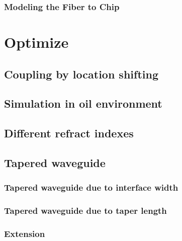 \subsection{Modeling the Fiber to Chip}
\label{sect:model_model_fiber2chip}


%
\chapter{Optimize}
\label{chp:optim}


\section{Coupling by location shifting}
\label{sect:optim_shift}


\section{Simulation in oil environment}


\section{Different refract indexes}


\section{Tapered waveguide}


\subsection{Tapered waveguide due to interface width} 


\subsection{Tapered waveguide due to taper length}


\subsection{Extension}
\label{sect:optim_tapered_ext}


